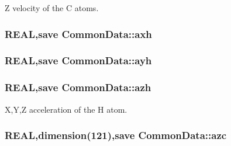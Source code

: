 Z velocity of the C atoms. \hypertarget{namespace_common_data_a92452d88a25f1d941bd33406eb4219ee}{
\subsubsection[{axh}]{\setlength{\rightskip}{0pt plus 5cm}REAL,save {\bf CommonData::axh}}}
\label{namespace_common_data_a92452d88a25f1d941bd33406eb4219ee}
\hypertarget{namespace_common_data_a4256419c9e9f412bf3d0f5984841a834}{
\subsubsection[{ayh}]{\setlength{\rightskip}{0pt plus 5cm}REAL,save {\bf CommonData::ayh}}}
\label{namespace_common_data_a4256419c9e9f412bf3d0f5984841a834}
\hypertarget{namespace_common_data_ad7ceb7c20d99e27c42aa1b1d3b579262}{
\subsubsection[{azh}]{\setlength{\rightskip}{0pt plus 5cm}REAL,save {\bf CommonData::azh}}}
\label{namespace_common_data_ad7ceb7c20d99e27c42aa1b1d3b579262}


X,Y,Z acceleration of the H atom. \hypertarget{namespace_common_data_a500e1c90c8246eced8ce0a8338de0c84}{
\subsubsection[{azc}]{\setlength{\rightskip}{0pt plus 5cm}REAL,dimension(121),save {\bf CommonData::azc}}}
\label{namespace_common_data_a500e1c90c8246eced8ce0a8338de0c84}


